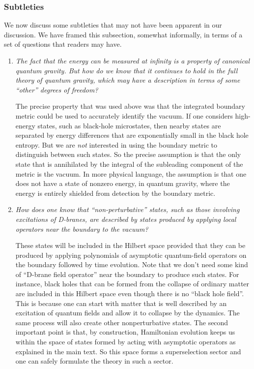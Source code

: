 \documentclass[12pt]{article}
\begin{document}
\subsubsection{Subtleties}
We now discuss some subtleties that may not have been apparent in our discussion. We have framed this subsection, somewhat informally,  in terms of a set of questions that readers may have.
\begin{enumerate}[qseries]
\item
{\em The fact that the energy can be measured at infinity is a property of canonical quantum gravity. But how do we know that it continues to hold in the full theory of quantum gravity, which may have a description in terms of some ``other'' degrees of freedom? } 

The precise property that was used above was that the  integrated boundary  metric could be used to accurately identify the vacuum. If one considers high-energy states, such as black-hole microstates, then nearby states are separated by 
energy differences that are exponentially small in the black hole entropy.  But we are {\em not} interested in using the boundary metric to distinguish between such states. So the precise assumption is that the  only state that is annihilated by the integral of the subleading component of the metric is the vacuum. In more physical language, the assumption is that one does not have a state of nonzero energy, in quantum gravity, where the energy is entirely shielded from detection by the boundary metric.
\item
{\em  How does one know that ``non-perturbative'' states, such as those involving excitations of D-branes, are described by states produced by applying local operators near the boundary to the vacuum?} 

These states will be included in the Hilbert space provided that they can be produced by applying polynomials of asymptotic quantum-field operators on the boundary followed by time evolution.  Note that we don't need some kind of ``D-brane field operator''  near the boundary to produce such states. For instance,  black holes that can be formed from the collapse of ordinary matter are included in this Hilbert space even though there is no ``black hole field''.  This is because one can start with matter that is well described by an excitation of quantum fields and allow it to collapse by the dynamics. The same process will also create other nonperturbative states. The second important point is that, by construction, Hamiltonian evolution keeps us within the space of states formed by acting with asymptotic operators as explained in the main text. So this space forms a superselection sector and one can safely formulate the theory in such a sector.




\end{enumerate}
\end{document}
